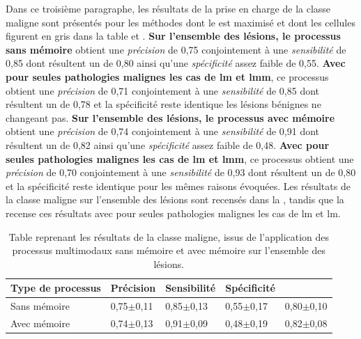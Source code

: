 Dans ce troisième paragraphe, les résultats de la prise en charge de la classe maligne sont présentés pour les méthodes dont le \fscore{} est maximisé et dont les cellules figurent en gris dans la table  et . \textbf{Sur l'ensemble des lésions, le \textbf{processus sans mémoire}} obtient une \textit{précision} de 0,75 conjointement à une \textit{sensibilité} de 0,85 dont résultent un \fscore{} de 0,80 ainsi qu'une \textit{spécificité} assez faible de 0,55. \textbf{Avec pour seules pathologies malignes les cas de \gls{lm} et \gls{lmm}}, ce processus obtient une \textit{précision} de 0,71 conjointement à une \textit{sensibilité} de 0,85 dont résultent un \fscore{} de 0,78 et la spécificité reste identique les lésions bénignes ne changeant pas. \textbf{Sur l'ensemble des lésions, le \textbf{processus avec mémoire}} obtient une \textit{précision} de 0,74 conjointement à une \textit{sensibilité} de 0,91 dont résultent un \fscore{} de 0,82 ainsi qu'une \textit{spécificité} assez faible de 0,48. \textbf{Avec pour seules pathologies malignes les cas de \gls{lm} et \gls{lmm}}, ce processus obtient une \textit{précision} de 0,70 conjointement à une \textit{sensibilité} de 0,93 dont résultent un \fscore{} de 0,80 et la spécificité reste identique pour les mêmes raisons évoquées. Les résultats de la classe maligne sur l'ensemble des lésions sont recensés dans la , tandis que la  recense ces résultats avec pour seules pathologies malignes les cas de \gls{lm} et \gls{lm}.\par

\begin{table}[H]
    \centering
    \begin{tabular}{lllll}
        \toprule 
        Type de processus   & Précision             & Sensibilité           & Spécificité           & \Fscore{}             \\ \midrule
        Sans mémoire        & 0,75$\pm$0,11 	    & 0,85$\pm$0,13 	    & 0,55$\pm$0,17 	    & 0,80$\pm$0,10         \\ \midrule
        Avec mémoire        & 0,74$\pm$0,13 	    & 0,91$\pm$0,09 	    & 0,48$\pm$0,19 	    & 0,82$\pm$0,08         \\ \bottomrule
    \end{tabular}
    \caption{Table reprenant les résultats de la classe maligne, issus de l'application des processus multimodaux sans mémoire et avec mémoire sur l'ensemble des lésions.}
    \label{tab:results_multimodal_process_malignant}
\end{table}

